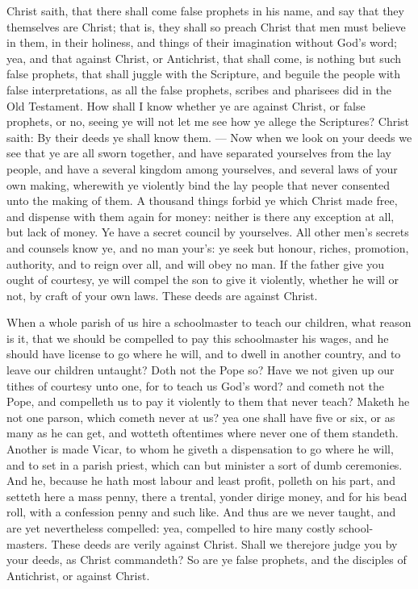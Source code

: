Christ saith, that there shall come false prophets
in his name, and say that they themselves 
are Christ; that is, they shall so preach Christ 
that men must believe in them, in their holiness,
and things of their imagination without God's word; 
yea, and that against Christ, or Antichrist, that 
shall come, is nothing but such false prophets,
that shall juggle with the Scripture, and 
beguile the people with false interpretations, as 
all the false prophets, scribes and pharisees did 
in the Old Testament. How shall I know whether
ye are against Christ, or false prophets, or 
no, seeing ye will not let me see how ye allege 
the Scriptures? Christ saith: By their deeds 
ye shall know them. — Now when we look on your 
deeds we see that ye are all sworn together, and 
have separated yourselves from the lay people, 
and have a several kingdom among yourselves, 
and several laws of your own making, wherewith 
ye violently bind the lay people that never consented
unto the making of them. A thousand 
things forbid ye which Christ made free, and 
dispense with them again for money: neither is 
there any exception at all, but lack of money. 
Ye have a secret council by yourselves. All 
other men's secrets and counsels know ye, and no 
man your's: ye seek but honour, riches, promotion,
authority, and to reign over all, and will obey 
no man. If the father give you ought of courtesy,
ye will compel the son to give it violently, 
whether he will or not, by craft of your own 
laws. These deeds are against Christ.

When a whole parish of us hire a schoolmaster
to teach our children, what reason is it, 
that we should be compelled to pay this schoolmaster
his wages, and he should have license to 
go where he will, and to dwell in another country, 
and to leave our children untaught? Doth not 
the Pope so? Have we not given up our tithes 
of courtesy unto one, for to teach us God's 
word? and cometh not the Pope, and compelleth 
us to pay it violently to them that never teach? 
Maketh he not one parson, which cometh never 
at us? yea one shall have five or six, or as many 
as he can get, and wotteth oftentimes where 
never one of them standeth. Another is made 
Vicar, to whom he giveth a dispensation to go 
where he will, and to set in a parish priest, which 
can but minister a sort of dumb ceremonies. 
And he, because he hath most labour and least 
profit, polleth on his part, and setteth here a mass 
penny, there a trental, yonder dirige money,
and for his bead roll, with a confession penny and 
such like. And thus are we never taught, and 
are yet nevertheless compelled: yea, compelled 
to hire many costly school-masters. These 
deeds are verily against Christ. Shall we therejore
judge you by your deeds, as Christ commandeth?
So are ye false prophets, and the 
disciples of Antichrist, or against Christ. 

